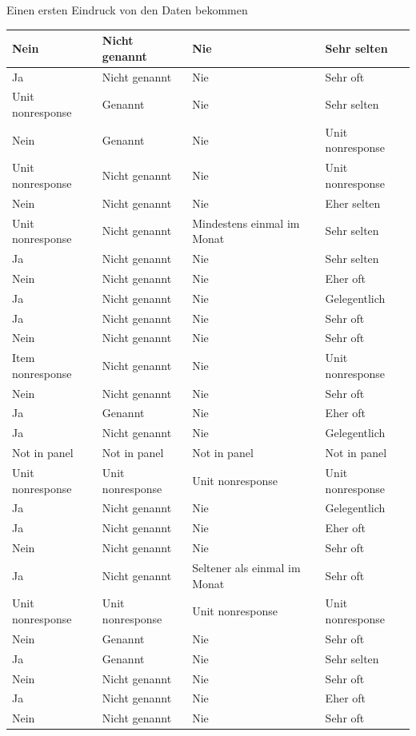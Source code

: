 \documentclass[ignorenonframetext,]{beamer}
\begin{document}
\begin{frame}{Einen ersten Eindruck von den Daten bekommen}
\begin{tabular}{l|l|l|l}
\hline
Nein & Nicht genannt & Nie & Sehr selten\\
\hline
Ja & Nicht genannt & Nie & Sehr oft\\
\hline
Unit nonresponse & Genannt & Nie & Sehr selten\\
\hline
Nein & Genannt & Nie & Unit nonresponse\\
\hline
Unit nonresponse & Nicht genannt & Nie & Unit nonresponse\\
\hline
Nein & Nicht genannt & Nie & Eher selten\\
\hline
Unit nonresponse & Nicht genannt & Mindestens einmal im Monat & Sehr selten\\
\hline
Ja & Nicht genannt & Nie & Sehr selten\\
\hline
Nein & Nicht genannt & Nie & Eher oft\\
\hline
Ja & Nicht genannt & Nie & Gelegentlich\\
\hline
Ja & Nicht genannt & Nie & Sehr oft\\
\hline
Nein & Nicht genannt & Nie & Sehr oft\\
\hline
Item nonresponse & Nicht genannt & Nie & Unit nonresponse\\
\hline
Nein & Nicht genannt & Nie & Sehr oft\\
\hline
Ja & Genannt & Nie & Eher oft\\
\hline
Ja & Nicht genannt & Nie & Gelegentlich\\
\hline
Not in panel & Not in panel & Not in panel & Not in panel\\
\hline
Unit nonresponse & Unit nonresponse & Unit nonresponse & Unit nonresponse\\
\hline
Ja & Nicht genannt & Nie & Gelegentlich\\
\hline
Ja & Nicht genannt & Nie & Eher oft\\
\hline
Nein & Nicht genannt & Nie & Sehr oft\\
\hline
Ja & Nicht genannt & Seltener als einmal im Monat & Sehr oft\\
\hline
Unit nonresponse & Unit nonresponse & Unit nonresponse & Unit nonresponse\\
\hline
Nein & Genannt & Nie & Sehr oft\\
\hline
Ja & Genannt & Nie & Sehr selten\\
\hline
Nein & Nicht genannt & Nie & Sehr oft\\
\hline
Ja & Nicht genannt & Nie & Eher oft\\
\hline
Nein & Nicht genannt & Nie & Sehr oft\\

\end{tabular}
\end{frame}
\end{document}
